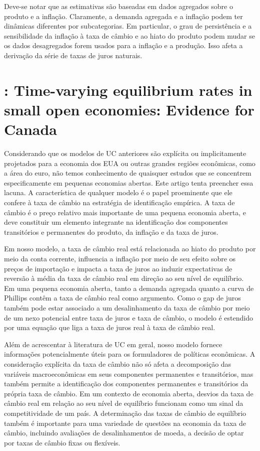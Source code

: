 Deve-se notar que as estimativas são baseadas em dados agregados sobre o produto e a inflação. Claramente, a demanda agregada e a inflação podem ter dinâmicas diferentes por subcategorias. Em particular, o grau de persistência e a sensibilidade da inflação à taxa de câmbio e ao hiato do produto podem mudar se os dados desagregados forem usados para a inflação e a produção. Isso afeta a derivação da série de taxas de juros naturais.
%
%
\section{\citet{Berger:2014}: Time-varying equilibrium rates in small open economies: Evidence for Canada}
Considerando que os modelos de UC anteriores são explícita ou implicitamente projetados para a economia dos EUA ou outras grandes regiões econômicas, como a área do euro, não temos conhecimento de quaisquer estudos que se concentrem especificamente em pequenas economias abertas. Este artigo tenta preencher essa lacuna. A característica de qualquer modelo é o papel proeminente que ele confere à taxa de câmbio na estratégia de identificação empírica. A taxa de câmbio é o preço relativo mais importante de uma pequena economia aberta, e deve constituir um elemento integrante na identificação dos componentes transitórios e permanentes do produto, da inflação e da taxa de juros.

Em nosso modelo, a taxa de câmbio real está relacionada ao hiato do produto por meio da conta corrente, influencia a inflação por meio de seu efeito sobre os preços de importação e impacta a taxa de juros ao induzir expectativas de reversão à média da taxa de câmbio real em direção ao seu nível de equilíbrio. Em uma pequena economia aberta, tanto a demanda agregada quanto a curva de Phillips contêm a taxa de câmbio real como argumento. Como o gap de juros também pode estar associado a um desalinhamento da taxa de câmbio por meio de um nexo potencial entre taxa de juros e taxa de câmbio, o modelo é estendido por uma equação que liga a taxa de juros real à taxa de câmbio real.

Além de acrescentar à literatura de UC em geral, nosso modelo fornece informações potencialmente úteis para os formuladores de políticas econômicas. A consideração explícita da taxa de câmbio não só afeta a decomposição das variáveis macroeconômicas em seus componentes permanentes e transitórios, mas também permite a identificação dos componentes permanentes e transitórios da própria taxa de câmbio. Em um contexto de economia aberta, desvios da taxa de câmbio real em relação ao seu nível de equilíbrio funcionam como um sinal da competitividade de um país. A determinação das taxas de câmbio de equilíbrio também é importante para uma variedade de questões na economia da taxa de câmbio, incluindo avaliações de desalinhamentos de moeda, a decisão de optar por taxas de câmbio fixas ou flexíveis.

